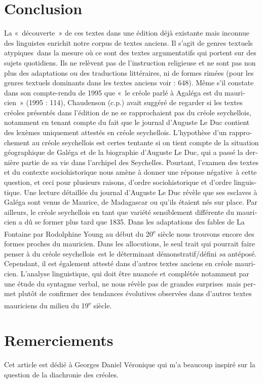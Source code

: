 \documentclass[output=paper]{langscibook}
\begin{document}
\begin{otherlanguage}{french}
\section{Conclusion}\label{sec:kriegel:5}
La «~découverte~» de ces textes dans une édition déjà existante mais inconnue des linguistes enrichit notre corpus de textes anciens. Il s’agit de genres textuels atypiques~dans la mesure où ce sont des textes argumentatifs qui portent sur des sujets quotidiens. Ils ne relèvent pas de l’instruction religieuse et ne sont pas non plus des adaptations ou des traductions littéraires, ni de formes rimées (pour les genres textuels dominants dans les textes anciens voir \citealt{Kriegel2015} : 648). Même s’il constate dans son compte-rendu de 1995 que «~le créole parlé à Agaléga est du mauricien~» (1995 : 114), Chaudenson (c.p.) avait suggéré de regarder si les textes créoles présentés dans l’édition de \citet{Pourcelet1994} ne se rapprochaient pas du créole seychellois, notamment en tenant compte du fait que le journal d’Auguste Le Duc contient des lexèmes uniquement attestés en créole seychellois. L’hypothèse d’un rapprochement au créole seychellois est certes tentante si on tient compte de la situation géographique de Galéga et de la biographie d’Auguste Le Duc, qui a passé la dernière partie de sa vie dans l’archipel des Seychelles. Pourtant, l’examen des textes et du contexte sociohistorique nous amène à donner une réponse négative~à cette question, et ceci pour plusieurs raisons, d’ordre sociohistorique et d’ordre linguistique. Une lecture détaillée du journal d’Auguste Le Duc révèle que ses esclaves à Galéga sont venus de Maurice, de Madagascar ou qu’ils étaient nés sur place. Par ailleurs, le créole seychellois en tant que variété sensiblement différente du mauricien a dû se former plus tard que 1835. Dans les adaptations des fables de La Fontaine par Rodolphine Young au début du 20\textsuperscript{e} siècle \citep{Young1983} nous trouvons encore des formes proches du mauricien. Dans les allocutions, le seul trait qui pourrait faire penser à du créole seychellois~est le déterminant démonstratif/défini \textit{sa} antéposé. Cependant, il est également attesté dans d’autres textes anciens en créole mauricien. L’analyse linguistique, qui doit être nuancée et complétée notamment par une étude du syntagme verbal, ne nous révèle pas de grandes surprises~mais permet plutôt de confirmer des tendances évolutives observées dans d’autres textes mauriciens du milieu du 19\textsuperscript{e} siècle.

\section*{Remerciements}
Cet article est dédié à Georges Daniel Véronique qui m’a beaucoup inspiré sur la question de la diachronie des créoles.

\printbibliography[heading=subbibliography,notkeyword=this]
\end{otherlanguage}
\end{document}
